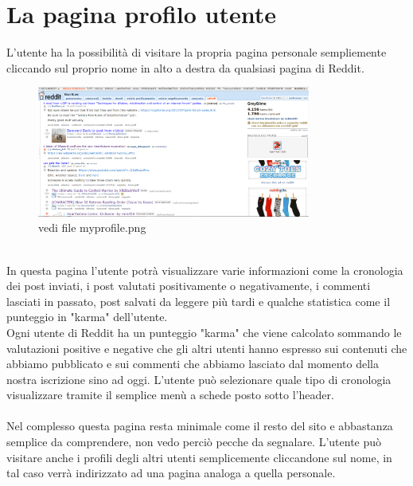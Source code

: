 \documentclass[12pt]{article}
\begin{document}
\section{La pagina profilo utente}
L'utente ha la possibilit\`a di visitare la propria pagina personale sempliemente cliccando sul proprio nome in alto a destra da qualsiasi pagina di Reddit. \\
\begin{figure}[ht!]
\centering
\includegraphics[width=90mm]{myprofile}
\caption{vedi file myprofile.png}
\end{figure} \\
In questa pagina l'utente potr\`a visualizzare varie informazioni come la cronologia dei post inviati, i post valutati positivamente o negativamente, i commenti lasciati in passato, post salvati da leggere pi\`u tardi e qualche statistica come il punteggio in "karma" dell'utente.\\ Ogni utente di Reddit ha un punteggio "karma" che viene calcolato sommando le valutazioni positive e negative che gli altri utenti hanno espresso sui contenuti che abbiamo pubblicato e sui commenti che abbiamo lasciato dal momento della nostra iscrizione sino ad oggi. L'utente pu\`o selezionare quale tipo di cronologia visualizzare tramite il semplice men\`u a schede posto sotto l'header.\\ \\Nel complesso questa pagina resta minimale come il resto del sito e abbastanza semplice da comprendere, non vedo perci\`o pecche da segnalare. L'utente pu\`o visitare anche i profili degli altri utenti semplicemente cliccandone sul nome, in tal caso verr\`a indirizzato ad una pagina analoga a quella personale. 
\end{document}
